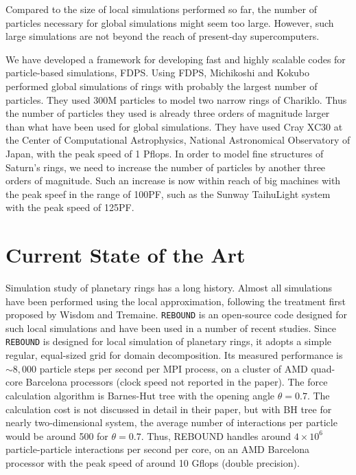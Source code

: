\documentclass[sigconf]{acmart}
\begin{document}
Compared to the size of local simulations performed so far, the number
of particles necessary for global simulations might seem too
large. However, such large simulations are not beyond the reach of
present-day supercomputers. 

We have developed a framework for developing fast and highly scalable
codes for particle-based simulations,
FDPS\cite{Iwasawaetal2016}. Using FDPS, Michikoshi and Kokubo
\cite{MichikoshiKokubo2017} performed global simulations of rings with
probably the largest number of particles. They used 300M particles to
model two narrow rings of Chariklo. Thus the number of particles they
used is already three orders of magnitude larger than what have been
used for global simulations. They have used Cray XC30 at the Center of
Computational Astrophysics, National Astronomical Observatory of
Japan, with the peak speed of 1 Pflops.  In order to model fine
structures of Saturn's rings, we need to increase the number of
particles by another three orders of magnitude. Such an increase is
now within reach of big machines with the peak speef in the range of
100PF, such as the Sunway TaihuLight system with the peak speed of
125PF.


\section{Current State of the Art}





Simulation study of planetary rings has a long history. Almost all
simulations have been performed using the local approximation,
following the treatment first proposed by Wisdom and
Tremaine\cite{WisdomTremaine1988}. {\tt REBOUND}\cite{ReinLiu2012} 
is an open-source code designed for such local simulations and have
been used in a number of recent studies. Since {\tt REBOUND} is
designed for local simulation of planetary rings, it adopts a simple
regular, equal-sized  grid for domain decomposition. Its measured
performance is $\sim 8,000$ particle steps per second per MPI process,
on a cluster of AMD quad-core Barcelona processors (clock speed not
reported in the paper). The force calculation algorithm is Barnes-Hut
tree\cite{BarnesHut1986} with the opening angle $\theta=0.7$. The
calculation cost is not discussed in detail in their paper, but with
BH tree for nearly two-dimensional system, the average number of
interactions per particle would be around 500 for $\theta=0.7$. Thus,
REBOUND handles around $4\times 10^6$ particle-particle interactions
per second per core, on an AMD Barcelona processor with the peak speed
of around 10 Gflops (double precision). 
\end{document}
